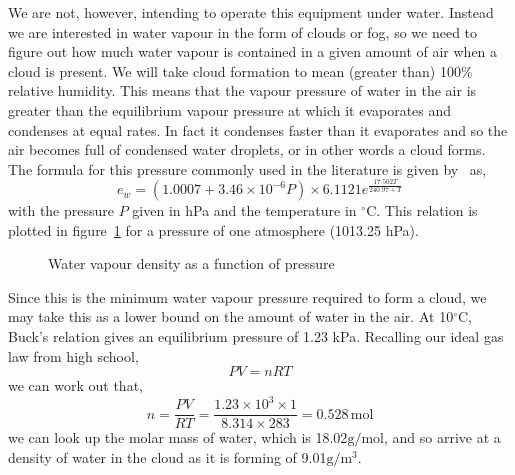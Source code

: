 We are not, however, intending to operate this equipment under
water. Instead we are interested in water vapour in the form of clouds
or fog, so we need to figure out how much water vapour is contained
in a given amount of air when a cloud is present. We will take cloud
formation to mean (greater than) 100\% relative humidity. This means
that the vapour pressure of water in the air is greater than the
equilibrium vapour pressure at which it evaporates and condenses at
equal rates. In fact it condenses faster than it evaporates and so the
air becomes full of condensed water droplets, or in other words a
cloud forms. The formula for this pressure commonly used in the
literature is given by~\cite{buck_new_1981} as,
\begin{equation}
  \label{eq:buck}
  e_w = (1.0007 + 3.46\times 10^{-6}P)\times 6.1121e^{\frac{17.502T}{240.97+T}}
\end{equation}
with the pressure $P$ given in hPa and the temperature in
$^\circ$C. This relation is plotted in figure~\ref{fig:water-pressure}
for a pressure of one atmosphere (1013.25 hPa).
\begin{figure}[h]
  \centering
  \caption{Water vapour density as a function of pressure}
  \label{fig:water-pressure}
\end{figure}

Since this is the minimum water vapour pressure required to form a
cloud, we may take this as a lower bound on the amount of water in the
air. At 10$^\circ$C, Buck's relation gives an equilibrium pressure of
1.23 kPa. Recalling our ideal gas law from high school,
\begin{equation}
  \label{eq:ideal-gas}
  PV = nRT
\end{equation}
we can work out that,
\begin{equation*}
  n = \frac{PV}{RT} 
    = \frac{1.23\times 10^3 \times 1}
           {8.314 \times 283}
    = 0.528\, \text{mol}
\end{equation*}
we can look up the molar mass of water, which is
18.02$\text{g}/\text{mol}$, and so arrive at a density of water in the
cloud as it is forming of 9.01$\text{g}/\text{m}^3$.

